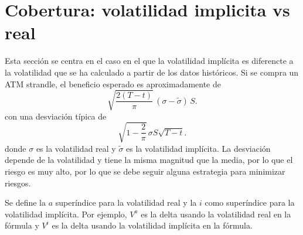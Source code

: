 \section{Cobertura: volatilidad implicita vs real}
Esta sección se centra en el caso en el que la volatilidad implícita es diferencte a la volatilidad que se ha calculado a partir de los datos históricos.
Si se compra un ATM strandle, el beneficio esperado es aproximadamente de
\[
\sqrt{\frac{2(T-t)}{\pi}}\, (\sigma - \tilde{\sigma})\, S.
\]
con una desviación típica de
\[
\sqrt{1 - \frac{2}{\pi}}\, \sigma S \sqrt{T-t}.
\]
donde $\sigma$ es la volatilidad real y $\tilde{\sigma}$ es la volatilidad implícita. La desviación depende de la volatilidad y tiene la misma magnitud que la media, por lo que el riesgo es muy alto, por lo que se debe seguir alguna estrategia para minimizar riesgos.

\begin{notation}
    Se define la $a$ superíndice para la volatilidad real y la $i$ como superíndice para la volatilidad implícita. Por ejemplo, $V^a$ es la delta usando la volatilidad real en la fórmula y $V^i$ es la delta usando la volatilidad implícita en la fórmula.
\end{notation}

